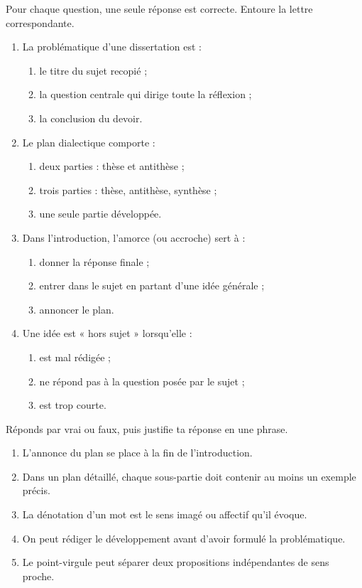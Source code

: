 \documentclass[11pt]{article}
\begin{document}
\begin{exercice}
Pour chaque question, une seule réponse est correcte. Entoure la lettre correspondante.
\begin{enumerate}
\item La problématique d'une dissertation est :
\begin{enumerate}
\item[a)] le titre du sujet recopié ;
\item[b)] la question centrale qui dirige toute la réflexion ;
\item[c)] la conclusion du devoir.
\end{enumerate}
\item Le plan dialectique comporte :
\begin{enumerate}
\item[a)] deux parties : thèse et antithèse ;
\item[b)] trois parties : thèse, antithèse, synthèse ;
\item[c)] une seule partie développée.
\end{enumerate}
\item Dans l'introduction, l'amorce (ou accroche) sert à :
\begin{enumerate}
\item[a)] donner la réponse finale ;
\item[b)] entrer dans le sujet en partant d'une idée générale ;
\item[c)] annoncer le plan.
\end{enumerate}
\item Une idée est « hors sujet » lorsqu'elle :
\begin{enumerate}
\item[a)] est mal rédigée ;
\item[b)] ne répond pas à la question posée par le sujet ;
\item[c)] est trop courte.
\end{enumerate}
\end{enumerate}
\end{exercice}

\begin{exercice}
Réponds par vrai ou faux, puis justifie ta réponse en une phrase.
\begin{enumerate}
\item L'annonce du plan se place à la fin de l'introduction.
\item Dans un plan détaillé, chaque sous-partie doit contenir au moins un exemple précis.
\item La dénotation d'un mot est le sens imagé ou affectif qu'il évoque.
\item On peut rédiger le développement avant d'avoir formulé la problématique.
\item Le point-virgule peut séparer deux propositions indépendantes de sens proche.
\end{enumerate}
\end{exercice}
\end{document}
